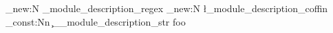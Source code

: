 \regex_new:N
  \g_module_description_regex
\coffin_new:N
  \l_module_description_coffin
\str_const:Nn
  \c__module_description_str
  { foo }
